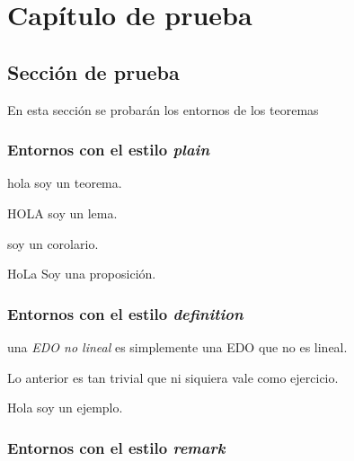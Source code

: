 \chapter{Capítulo de prueba}
\lipsum[1-3]

\section{Sección de prueba}

En esta sección se probarán los entornos de los teoremas
\subsection{Entornos con el estilo \textit{plain}}

\begin{theorem}
hola soy un teorema.
\end{theorem}

\begin{lemma}
HOLA soy un lema.
\end{lemma}

\begin{corollary}
soy un corolario.
\end{corollary}

\begin{proposition}
HoLa Soy una proposición.
\end{proposition}


\subsection{Entornos con el estilo \textit{definition}}

\begin{definition}
una \textit{EDO no lineal} es simplemente una EDO que no es lineal.
\end{definition}

\begin{exercise}[Ejercicio]
Lo anterior es tan trivial que ni siquiera vale como ejercicio.
\end{exercise}

\begin{example}
Hola soy un ejemplo.
\end{example}



\subsection{Entornos con el estilo \textit{remark}}

